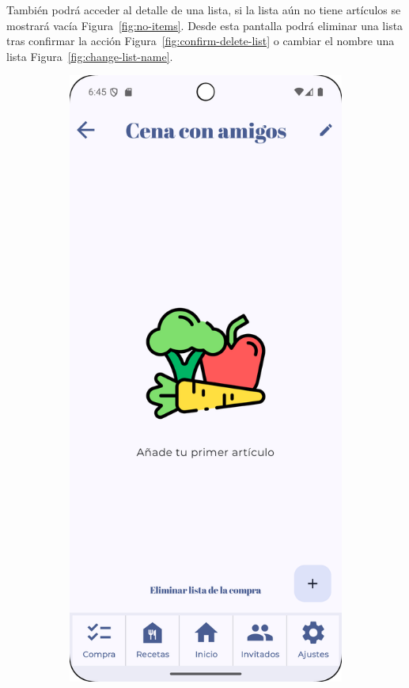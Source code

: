 \clearpage
También podrá acceder al detalle de una lista, si la lista aún no tiene artículos se mostrará vacía Figura~\ref{fig:no-items}. Desde esta pantalla podrá eliminar una lista tras confirmar la acción Figura~\ref{fig:confirm-delete-list} o cambiar el nombre una lista Figura~\ref{fig:change-list-name}.

\begin{figure}[H]
    \centering

    \begin{subfigure}[b]{0.3\textwidth}
      \includegraphics[width=\textwidth]{./img/manual/pinche_shopping_list_empty_items.png}

\end{subfigure}
\end{figure}
